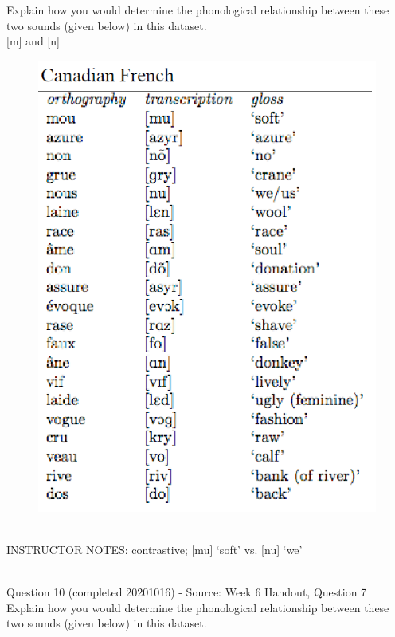 \documentclass[12pt]{article}
\begin{document}
Explain how you would determine the phonological relationship between these two sounds (given below) in this dataset.\\

{[m]} and {[n]}

\begin{figure}[H]
\includegraphics{../images/canadianfrench.png}
\end{figure}

~\\
INSTRUCTOR NOTES: contrastive; [mu] ‘soft’ vs. [nu] ‘we’


~\\

{\large Question 10} (completed 20201016) - Source: Week 6 Handout, Question 7\\

Explain how you would determine the phonological relationship between these two sounds (given below) in this dataset.\\
\end{document}
